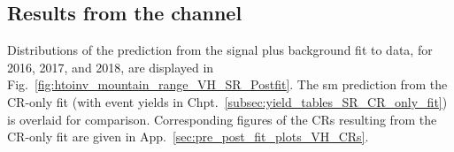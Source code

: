 

\subsection{Results from the \texorpdfstring{\VH}{VH} channel}
\label{subsec:htoinv_results_VH}

Distributions of the prediction from the signal plus background fit to data, for 2016, 2017, and 2018, are displayed in Fig.~\ref{fig:htoinv_mountain_range_VH_SR_Postfit}. The \acrshort{sm} prediction from the \gls{CR}-only fit (with event yields in Chpt.~\ref{subsec:yield_tables_SR_CR_only_fit}) is overlaid for comparison. Corresponding figures of the \glspl{CR} resulting from the \gls{CR}-only fit are given in App.~\ref{sec:pre_post_fit_plots_VH_CRs}.

